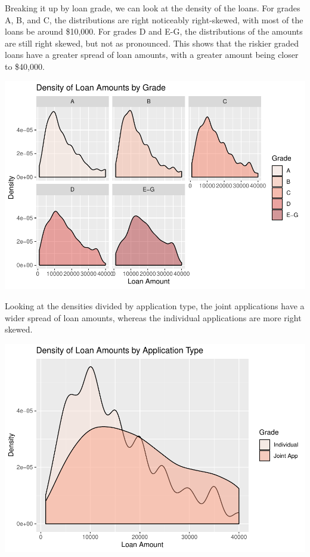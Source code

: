 \documentclass[11pt,]{article}
\begin{document}
Breaking it up by loan grade, we can look at the density of the loans.
For grades A, B, and C, the distributions are right noticeably
right-skewed, with most of the loans be around \$10,000. For grades D
and E-G, the distributions of the amounts are still right skewed, but
not as pronounced. This shows that the riskier graded loans have a
greater spread of loan amounts, with a greater amount being closer to
\$40,000.

\includegraphics{An-Analysis-of-LendingClub-Loan-Grades_files/figure-latex/unnamed-chunk-5-1.pdf}

Looking at the densities divided by application type, the joint
applications have a wider spread of loan amounts, whereas the individual
applications are more right skewed.

\includegraphics{An-Analysis-of-LendingClub-Loan-Grades_files/figure-latex/unnamed-chunk-6-1.pdf}
\end{document}

